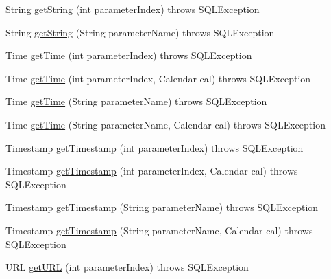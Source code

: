\begin{DoxyCompactItemize}
\item 
String \mbox{\hyperlink{classcom_1_1mysql_1_1cj_1_1jdbc_1_1_callable_statement_a003eb4a2772e2ed3d56e94c6a5329c90}{get\+String}} (int parameter\+Index)  throws S\+Q\+L\+Exception 
\item 
String \mbox{\hyperlink{classcom_1_1mysql_1_1cj_1_1jdbc_1_1_callable_statement_ab7834c33851bc5ef89b347980188d89e}{get\+String}} (String parameter\+Name)  throws S\+Q\+L\+Exception 
\item 
Time \mbox{\hyperlink{classcom_1_1mysql_1_1cj_1_1jdbc_1_1_callable_statement_a3cccf3351176e00eaa0d0fc817912868}{get\+Time}} (int parameter\+Index)  throws S\+Q\+L\+Exception 
\item 
Time \mbox{\hyperlink{classcom_1_1mysql_1_1cj_1_1jdbc_1_1_callable_statement_aefec73ec4f73a6f345d8068f40b370aa}{get\+Time}} (int parameter\+Index, Calendar cal)  throws S\+Q\+L\+Exception 
\item 
Time \mbox{\hyperlink{classcom_1_1mysql_1_1cj_1_1jdbc_1_1_callable_statement_a159ebf9a2c557e3b3be590039e235706}{get\+Time}} (String parameter\+Name)  throws S\+Q\+L\+Exception 
\item 
Time \mbox{\hyperlink{classcom_1_1mysql_1_1cj_1_1jdbc_1_1_callable_statement_abf92189287e2a654e1c59e348cb11928}{get\+Time}} (String parameter\+Name, Calendar cal)  throws S\+Q\+L\+Exception 
\item 
Timestamp \mbox{\hyperlink{classcom_1_1mysql_1_1cj_1_1jdbc_1_1_callable_statement_a106f01266c7bfbaa1c14e3a5a3be0d2b}{get\+Timestamp}} (int parameter\+Index)  throws S\+Q\+L\+Exception 
\item 
Timestamp \mbox{\hyperlink{classcom_1_1mysql_1_1cj_1_1jdbc_1_1_callable_statement_a95a1e742a567a1dfe798b172770acfe3}{get\+Timestamp}} (int parameter\+Index, Calendar cal)  throws S\+Q\+L\+Exception 
\item 
Timestamp \mbox{\hyperlink{classcom_1_1mysql_1_1cj_1_1jdbc_1_1_callable_statement_ad259b38c5fa0c1d844e7a2a2d78c420f}{get\+Timestamp}} (String parameter\+Name)  throws S\+Q\+L\+Exception 
\item 
Timestamp \mbox{\hyperlink{classcom_1_1mysql_1_1cj_1_1jdbc_1_1_callable_statement_ae256b922dcf07dac53e51154a618f1c3}{get\+Timestamp}} (String parameter\+Name, Calendar cal)  throws S\+Q\+L\+Exception 
\item 
U\+RL \mbox{\hyperlink{classcom_1_1mysql_1_1cj_1_1jdbc_1_1_callable_statement_a64d354f54f05a378cc69bff200a58093}{get\+U\+RL}} (int parameter\+Index)  throws S\+Q\+L\+Exception 
\item 

\end{DoxyCompactItemize}
